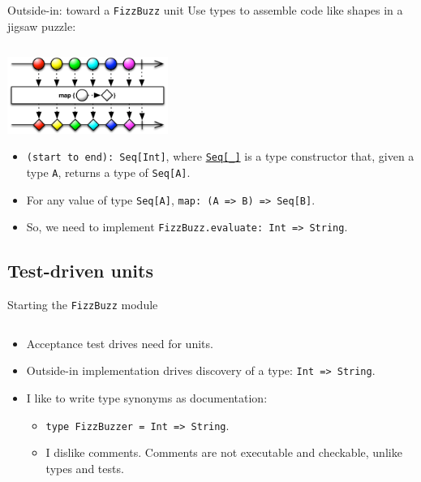 \begin{frame}[fragile]{Outside-in: toward a \texttt{FizzBuzz} unit}
  Use types to assemble code like shapes in a jigsaw puzzle:

  \inputminted{scala}{Main4.scala}

  \begin{center}
    \includegraphics[height=2.5cm]{map.png}
  \end{center}

  \begin{itemize}
  \item \texttt{(start to end): Seq[Int]}, where \href{http://www.scala-lang.org/api/2.11.0/index.html\#scala.collection.Seq}{\texttt{Seq[_]}} is a \alert{type constructor} that, given a type \texttt{A}, returns a type of \texttt{Seq[A]}.
  \item For any value of type \texttt{Seq[A]}, \texttt{map: (A => B) => Seq[B]}.
  \item So, we need to implement \texttt{FizzBuzz.evaluate: Int => String}.
  \end{itemize}
\end{frame}

\subsection{Test-driven units}

\begin{frame}[fragile]{Starting the \texttt{FizzBuzz} module}
  \inputminted{scala}{FizzBuzz1.scala}

  \begin{itemize}
  \item Acceptance test drives need for units.
  \item Outside-in implementation drives discovery of a type:      
    \texttt{Int => String}.
  \item I like to write \alert{type synonyms} as \alert{documentation}:
    \begin{itemize}
    \item \texttt{type FizzBuzzer = Int => String}.
    \item I dislike \alert{comments}. Comments are not executable and checkable, unlike types and tests.
    \end{itemize}
  \end{itemize}
\end{frame}

